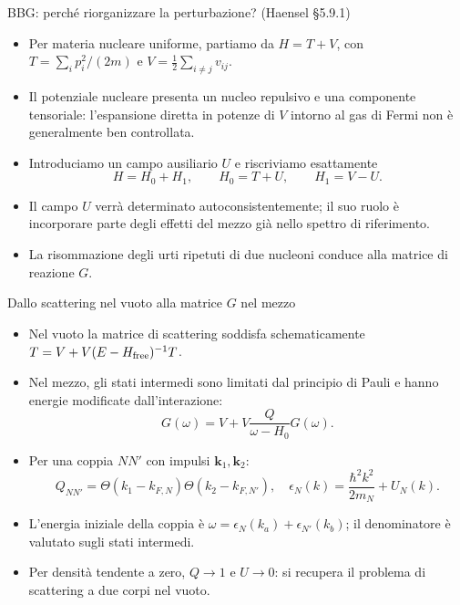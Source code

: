 \begin{frame}[t]{BBG: perché riorganizzare la perturbazione? (Haensel \S5.9.1)}
\small
\begin{itemize}
\item Per materia nucleare uniforme, partiamo da $H=T+V$, con $T=\sum_i p_i^2/(2m)$ e $V=\frac12\sum_{i\ne j}v_{ij}$.
\item Il potenziale nucleare presenta un nucleo repulsivo e una componente tensoriale: l'espansione diretta in potenze di $V$ intorno al gas di Fermi non è generalmente ben controllata.
\item Introduciamo un campo ausiliario $U$ e riscriviamo esattamente
\[
H=H_0+H_1,\qquad H_0=T+U,\qquad H_1=V-U.
\]
\item Il campo $U$ verrà determinato autoconsistentemente; il suo ruolo è incorporare parte degli effetti del mezzo già nello spettro di riferimento.
\item La risommazione degli urti ripetuti di due nucleoni conduce alla matrice di reazione $G$.
\end{itemize}
\end{frame}

\begin{frame}[t]{Dallo scattering nel vuoto alla matrice $G$ nel mezzo}
\small
\begin{itemize}
\item Nel vuoto la matrice di scattering soddisfa schematicamente $T=V+V(E-H_{\rm free})^{-1}T$.
\item Nel mezzo, gli stati intermedi sono limitati dal principio di Pauli e hanno energie modificate dall'interazione:
\[
G(\omega)=V+V\frac{Q}{\omega-H_0}G(\omega).
\]
\item Per una coppia $NN'$ con impulsi $\mathbf k_1,\mathbf k_2$:
\[
Q_{NN'}=\Theta(k_1-k_{F,N})\Theta(k_2-k_{F,N'}),\quad
\epsilon_N(k)=\frac{\hbar^2 k^2}{2m_N}+U_N(k).
\]
\item L'energia iniziale della coppia è $\omega=\epsilon_N(k_a)+\epsilon_{N'}(k_b)$; il denominatore è valutato sugli stati intermedi.
\item Per densità tendente a zero, $Q\to1$ e $U\to0$: si recupera il problema di scattering a due corpi nel vuoto.
\end{itemize}
\end{frame}

